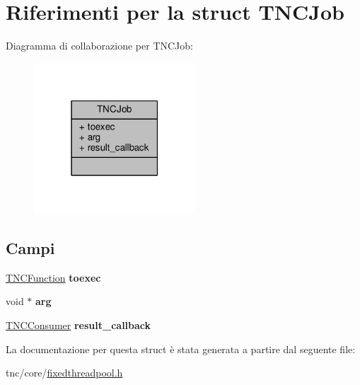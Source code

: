 \hypertarget{structTNCJob}{}\section{Riferimenti per la struct T\+N\+C\+Job}
\label{structTNCJob}


Diagramma di collaborazione per T\+N\+C\+Job\+:\nopagebreak
\begin{figure}[H]
\begin{center}
\leavevmode
\includegraphics[width=171pt]{structTNCJob__coll__graph}
\end{center}
\end{figure}
\subsection*{Campi}
\begin{DoxyCompactItemize}
\item 
\hypertarget{structTNCJob_a9700d43a243f74081b3157d32d86bde2}{}\hyperlink{functiontypes_8h_ab55be5b67db12c27273a3598b1be3d8a}{T\+N\+C\+Function} {\bfseries toexec}\label{structTNCJob_a9700d43a243f74081b3157d32d86bde2}

\item 
\hypertarget{structTNCJob_af68654e56326315994369f9652f26deb}{}void $\ast$ {\bfseries arg}\label{structTNCJob_af68654e56326315994369f9652f26deb}

\item 
\hypertarget{structTNCJob_a561ecf6ddfc315c7307d10325c5777c5}{}\hyperlink{functiontypes_8h_a78b4c663dde4687b8cddd1ca6031cadb}{T\+N\+C\+Consumer} {\bfseries result\+\_\+callback}\label{structTNCJob_a561ecf6ddfc315c7307d10325c5777c5}

\end{DoxyCompactItemize}


La documentazione per questa struct è stata generata a partire dal seguente file\+:\begin{DoxyCompactItemize}
\item 
tnc/core/\hyperlink{fixedthreadpool_8h}{fixedthreadpool.\+h}\end{DoxyCompactItemize}

